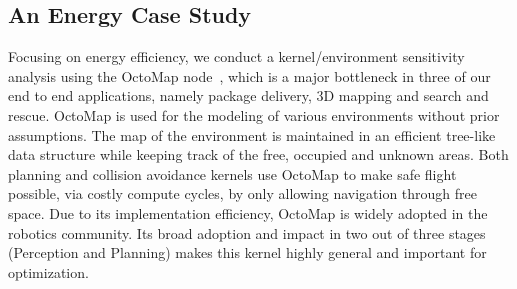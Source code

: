 \subsection{An Energy Case Study} 

Focusing on energy efficiency, we conduct a kernel/environment sensitivity analysis using the OctoMap node~\cite{octomap}, which is a major bottleneck in three of our end to end applications, namely package delivery, 3D mapping and search and rescue. OctoMap is used for the modeling of various environments without prior assumptions. The map of the environment is maintained in an efficient tree-like data structure while keeping track of the free, occupied and unknown areas. Both planning and collision avoidance kernels use OctoMap to make safe flight possible, via costly compute cycles, by only allowing navigation through free space. Due to its implementation efficiency, OctoMap is widely adopted in the robotics community. Its broad adoption and impact in two out of three stages (Perception and Planning) makes this kernel highly general and important for optimization.

